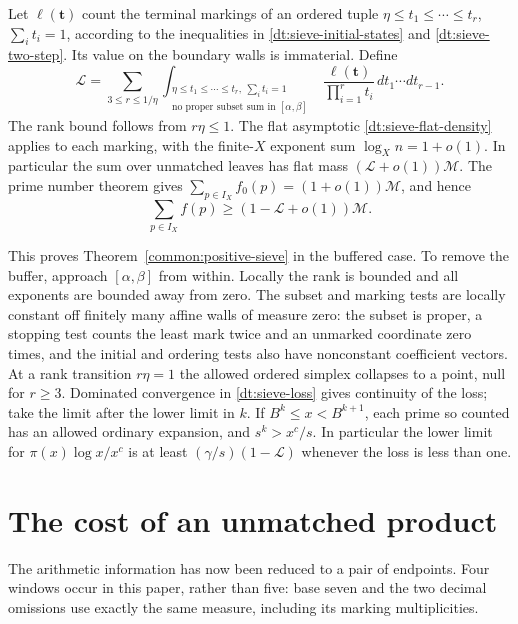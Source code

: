\documentclass[11pt,a4paper]{article}
\theoremstyle{paperplain}
\numberwithin{equation}{section}
\begin{document}
Let \(\ell(\boldsymbol t)\) count the terminal markings
of an ordered tuple \(\eta\le t_1\le\cdots\le t_r\),
\(\sum_i t_i=1\), according to the inequalities in
\eqref{dt:sieve-initial-states} and \eqref{dt:sieve-two-step}.
Its value on the boundary walls is immaterial. Define
\begin{equation}
 \mathscr L
  =\sum_{3\le r\le 1/\eta}
     \int_{\substack{\eta\le t_1\le\cdots\le t_r,\
             \sum_i t_i=1\\\text{no proper subset sum in }[\alpha,\beta]}}
      \frac{\ell(\boldsymbol t)}{\prod_{i=1}^r t_i}
          \,dt_1\cdots dt_{r-1}.
 \label{dt:sieve-loss}
\end{equation}
The rank bound follows from $r\eta\le1$.
The flat asymptotic \eqref{dt:sieve-flat-density} applies
to each marking, with the finite-\(X\) exponent sum
\(\log_X n=1+o(1)\). In particular the sum over unmatched
leaves has flat mass \((\mathscr L+o(1))\mathcal M\).
The prime number theorem gives
\(\sum_{p\in I_X}f_0(p)=(1+o(1))\mathcal M\), and hence
\begin{equation}
     \sum_{p\in I_X} f(p)
           \ge (1-\mathscr L+o(1))\mathcal M .
 \label{dt:sieve-lower}
\end{equation}


This proves Theorem~\ref{common:positive-sieve} in the buffered case.
To remove the buffer, approach $[\alpha,\beta]$ from within.
Locally the rank is bounded and all exponents are bounded away from
zero. The subset and marking tests are locally constant off finitely
many affine walls of measure zero: the subset is proper, a stopping
test counts the least mark twice and an unmarked coordinate zero
times, and the initial and ordering tests also have nonconstant
coefficient vectors. At a rank transition $r\eta=1$ the allowed
ordered simplex collapses to a point, null for $r\ge3$. Dominated convergence in
\eqref{dt:sieve-loss} gives continuity of the loss; take the limit
after the lower limit in $k$. If $B^k\le x<B^{k+1}$, each prime so
counted has an allowed ordinary expansion, and $s^k>x^c/s$.
In particular the lower limit for $\pi(x)\log x/x^c$ is at least
$(\gamma/s)(1-\mathscr L)$ whenever the loss is less than one.


\clearpage
\section{The cost of an unmatched product}\label{dt:sieve-certificate}
The arithmetic information has now been reduced to a pair of
endpoints. Four windows occur in this paper, rather than five:
base seven and the two decimal omissions use exactly the same
measure, including its marking multiplicities.
\end{document}
